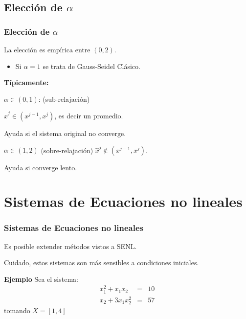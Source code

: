 \documentclass[xcolor=svgnames]{beamer} %
\theoremstyle{plain}
\renewcommand{\textbf}[1]{{\bfseries\textcolor{redUnq2}{#1}}}
\theoremstyle{definition}
\begin{document}
\subsection{Elección de $\alpha$}

\begin{frame}
\frametitle{Elección de $\alpha$}
La elección es empírica entre $(0,2)$.


\begin{itemize}
\pause
\item Si $\alpha=1$ se trata de Gauss-Seidel Clásico.
\end{itemize}

\textbf{Típicamente:}

\begin{minipage}{.45\linewidth}
\pause
$\alpha \in (0,1)$: (sub-relajación) 

$\hat x^j \in (x^{j-1},x^j)$, es decir un promedio.
\pause 

Ayuda si el sistema original no converge.
\end{minipage}  \vrule  \begin{minipage}{.45\linewidth}
\pause
$\alpha \in (1,2)$ (sobre-relajación) 
$\hat x^j \notin (x^{j-1},x^j)$.\vspace{10pt}
\pause 

Ayuda si converge lento.
\end{minipage}

\end{frame}

\section{Sistemas de Ecuaciones no lineales}

\begin{frame}
\frametitle{Sistemas de Ecuaciones no lineales}
Es posible extender métodos vistos a SENL.\vspace{15pt}
\pause 

Cuidado, estos sistemas son más sensibles a condiciones iniciales.\vspace{15pt}
\pause

\textbf{Ejemplo}
Sea el sistema:
$$\begin{array}{ccc}
x_1^2 +x_1 x_2 &=& 10\\
x_2 +3x_1 x_2^2 &=& 57
\end{array}$$
tomando $X = [1,4]$ 

\end{frame}
\end{document}
